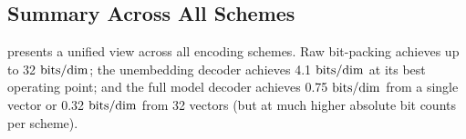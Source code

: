 \subsection{Summary Across All Schemes}
\label{sec:results_summary}

 presents a unified view across all encoding schemes. Raw bit-packing achieves up to 32 $\mathrm{bits/dim}$; the unembedding decoder achieves 4.1 $\mathrm{bits/dim}$ at its best operating point; and the full model decoder achieves 0.75 $\mathrm{bits/dim}$ from a single vector or 0.32 $\mathrm{bits/dim}$ from 32 vectors (but at much higher absolute bit counts per scheme).

\begin{table}[t]
    \centering
    \caption{Summary across all encoding schemes. Random tokens except where noted. Bits/dim computed as total bits stored divided by 768 (or $\nummem \times 768$ for multi-vector).}
    \label{tab:summary}
\end{table}
